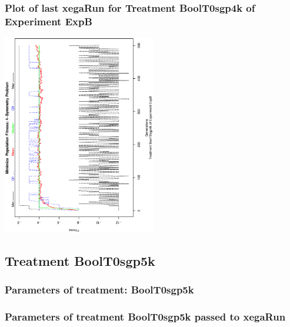 \documentclass[18pt,c]{beamer}
\makeatletter
\def\beamer@writeslidentry@miniframesoff{%
  \expandafter\beamer@ifempty\expandafter{\beamer@framestartpage}{}%
  {%
   \clearpage\beamer@notesactions%
  }
}
\newcommand*{\miniframesoff}{\let\beamer@writeslidentry=\beamer@writeslidentry@miniframesoff}
\makeatother
\begin{document}
 \begin{frame}
 \frametitle{ Plot of last xegaRun for Treatment BoolT0sgp4k of Experiment ExpB }
 \begin{center}
\includegraphics[width=0.5\textwidth, angle=-90]
{ExpBPlotPopStatsFigure002.eps}
 \end{center}
 \label{report/ExpBPlotPopStatsFigure002.eps}  
 \end{frame}

\miniframesoff
\subsection{Treatment BoolT0sgp5k}

 \begin{frame}
 \fontsize{8pt}{9pt}\selectfont
 \frametitle{  Parameters of treatment: BoolT0sgp5k 
 }

 \label{ExpBtParmTable012.tex}  
 \end{frame}


 \begin{frame}
 \fontsize{8pt}{9pt}\selectfont
 \frametitle{  Parameters of treatment BoolT0sgp5k passed to xegaRun
 }

 \label{ExpBtParmTable013.tex}  
 \end{frame}
\end{document}
